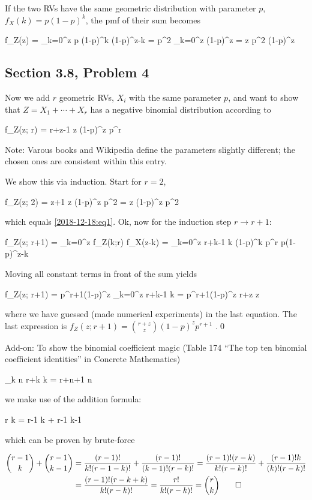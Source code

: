 If the two RVs have the same geometric distribution with parameter $p$, $f_X(k) = p(1-p)^ k$, the pmf of their sum becomes

\be\label{2018-12-18:eq1}
f_Z(z) = \sum_{k=0}^z p (1-p)^k (1-p)^{z-k} = p^2 \sum_{k=0}^z (1-p)^z = z p^2 (1-p)^z
\ee


\subsection{Section 3.8, Problem 4}

Now we add $r$ geometric RVs, $X_i$ with the same parameter $p$, and want to show that $Z = X_1 + \cdots + X_r$ has a negative binomial distribution according to

\bee
f_Z(z; r) = {r+z-1 \choose z} (1-p)^z p^r
\eee

Note: Varous books and Wikipedia define the parameters slightly different; the chosen ones are consistent within this entry.

We show this via induction. Start for $r=2$,

\bee
f_Z(z; 2) = {z+1 \choose z} (1-p)^z p^2 = z (1-p)^z p^2
\eee

which equals \eqref{2018-12-18:eq1}. Ok, now for the induction step $r \rightarrow r+1$:

\bee
f_Z(z; r+1) = \sum_{k=0}^z f_Z(k;r) f_X(z-k) = \sum_{k=0}^z {r+k-1 \choose k} (1-p)^k p^r p(1-p)^{z-k}
\eee

Moving all constant terms in front of the sum yields

\bee
f_Z(z; r+1) = p^{r+1}(1-p)^z \sum_{k=0}^z {r+k-1 \choose k} = p^{r+1}(1-p)^z {r+z \choose z}
\eee

where we have guessed (made numerical experiments) in the last equation. The last expression is $f_Z(z; r+1) = {r+z \choose z} (1-p)^z p^{r+1}$ .\qed

Add-on: To show the binomial coefficient magic (Table 174 ``The top ten binomial coefficient identities''  in Concrete Mathematics)

\bee
\sum_{k \leq n} {r+k \choose k} = {r+n+1 \choose n}
\eee

we make use of the addition formula:

\bee
{r \choose k} = {r-1 \choose k} + {r-1 \choose k-1}
\eee

which can be proven by brute-force

\begin{align*}
{r-1 \choose k} + {r-1 \choose k-1} &= \frac{(r-1)!}{k!(r-1-k)!} + \frac{(r-1)!}{(k-1)!(r-k)!} = \frac{(r-1)!(r-k)}{k!(r-k)!} + \frac{(r-1)!k}{(k)!(r-k)!} \\ &= \frac{(r-1)!(r-k+k)}{k!(r-k)!} = \frac{r!}{k!(r-k)!} = {r \choose k} \qed
\end{align*}

